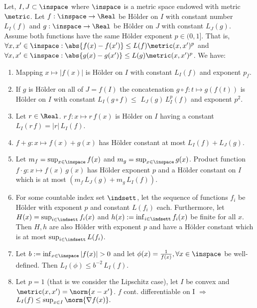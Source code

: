 \begin{lem} \label{lem:Hoeldarithmetic}
Let, $I,J \subset \inspace$ where $\inspace$ is a metric space endowed with metric $\metric$. Let $f : \inspace \to \Real$ be H\"older on $I$ with constant number $L_I (f)$ 
and $g :\inspace \to \Real$ be H\"older on $J$ with constant $L_J (g)$. Assume both functions have the same H\"older exponent $p \in (0,1]$. That is, $\forall x, x' \in \inspace: \abs{f(x)-f(x')} \leq L(f) \metric(x,x')^p$ and  $\forall x, x' \in \inspace: \abs{g(x)-g(x')} \leq L(g)  \metric(x,x')^p$.
We have:

\begin{enumerate}
	\item Mapping $x \mapsto |f(x)|$ is H\"older on $I$ with constant $L_I(f)$ and exponent $p_f$.
	\item If $g$ is H\"older on all of $J=f(I)$ the concatenation $g \circ f: t \mapsto g(f(t))$ is H\"older on $I$ with constant 
	      $L_I(g \circ f) \leq$ $L_J (g) \, L_I^p(f)$ and exponent $p^2$.
	\item Let $r \in \Real$. $r \, f: x \mapsto r \, f(x)$ is H\"older on $I$ having a constant $L_I (r \,f) = |r| \, L_I(f)$.
	\item $f+g: x \mapsto f(x) + g(x)$ has H\"older constant at most $L_I(f) + L_J(g)$.
	\item Let $m_f = \sup_{x\in \inspace } f(x)$ and $m_g = \sup_{x \in \inspace } g(x)$. Product function $f\cdot g: x \mapsto f(x) \, g(x)$ has H\"older exponent $p$ and a H\"older constant on $I$ which is at most $(m_f \, L_J(g)+ m_g \, L_I(f))$.
	\item For some countable index set $\indsett$, let the sequence of functions $f_i$ be H\"older with exponent $p$ and constant $L(f_i)$ each. Furthermore, let $H(x) =\sup_{i \in \indsett} f_i(x) $ and $h(x) := \inf_{i \in \indsett} f_i(x)$ be finite for all $x$. Then $H,h$ are also H\"older with exponent $p$ and have a H\"older constant which is at most $\sup_{i \in \indsett} L(f_i)$.
	\item Let $b := \inf_{x \in \inspace }| f(x)| > 0$ and let 
	$\phi(x) = \frac{1}{f(x)}, \forall x \in \inspace$ be well-defined.  
	      Then $L_I(\phi) \leq b^{-2} \, L_I(f)$.  
	\item Let $p=1$ (that is we consider the Lipschitz case), let $I$ be convex and $\metric(x,x') = \norm{x-x'}$. $f$ cont. differentiable on I $\Rightarrow$ $L_I(f) \leq \sup_{x \in I } \norm{\nabla f(x)}. $ 

\end{enumerate}
\end{lem}
